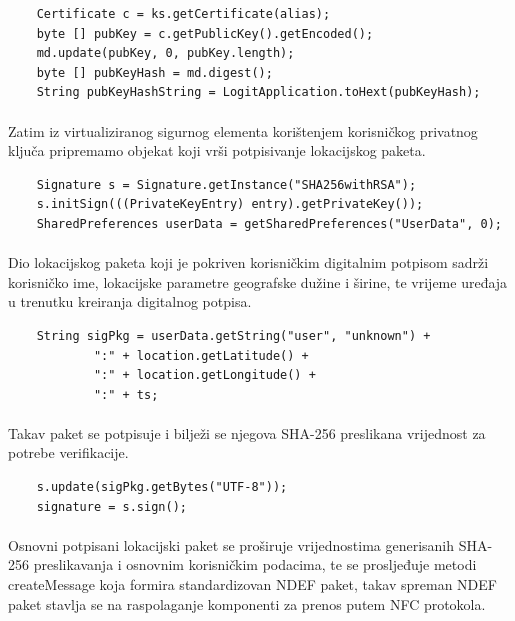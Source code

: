 \begin{verbatim}
    Certificate c = ks.getCertificate(alias);
    byte [] pubKey = c.getPublicKey().getEncoded();
    md.update(pubKey, 0, pubKey.length);
    byte [] pubKeyHash = md.digest();
    String pubKeyHashString = LogitApplication.toHext(pubKeyHash);
\end{verbatim}

\paragraph*{}
Zatim iz virtualiziranog sigurnog elementa korištenjem korisničkog privatnog ključa pripremamo objekat koji vrši potpisivanje lokacijskog paketa.

\begin{verbatim}
    Signature s = Signature.getInstance("SHA256withRSA");
    s.initSign(((PrivateKeyEntry) entry).getPrivateKey());
    SharedPreferences userData = getSharedPreferences("UserData", 0);
\end{verbatim}

\paragraph*{}
Dio lokacijskog paketa koji je pokriven korisničkim digitalnim potpisom sadrži korisničko ime, lokacijske parametre geografske dužine i širine, te vrijeme uređaja u trenutku kreiranja digitalnog potpisa.

\begin{verbatim}
    String sigPkg = userData.getString("user", "unknown") +
            ":" + location.getLatitude() +
            ":" + location.getLongitude() +
            ":" + ts;
\end{verbatim}

\paragraph*{}
Takav paket se potpisuje i bilježi se njegova SHA-256 preslikana vrijednost za potrebe verifikacije.

\begin{verbatim}
    s.update(sigPkg.getBytes("UTF-8"));
    signature = s.sign();
\end{verbatim}

\paragraph*{}
Osnovni potpisani lokacijski paket se proširuje vrijednostima generisanih SHA-256 preslikavanja i osnovnim korisničkim podacima, te se prosljeđuje metodi createMessage koja formira standardizovan NDEF paket, takav spreman NDEF paket stavlja se na raspolaganje komponenti za prenos putem NFC protokola.

